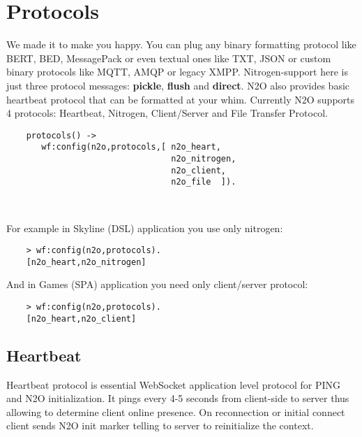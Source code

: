 
\section{Protocols}

We made it to make you happy.
You can plug any binary formatting protocol like BERT, BED, MessagePack
or even textual ones like TXT, JSON or custom binary protocols like MQTT, AMQP or legacy XMPP.
Nitrogen-support here is just three protocol messages: {\bf pickle}, {\bf flush} and {\bf direct}.
N2O also provides basic heartbeat protocol that can be formatted at your whim.
Currently N2O supports 4 protocols: Heartbeat, Nitrogen, Client/Server and File Transfer Protocol.

\vspace{1\baselineskip}
\begin{lstlisting}
    protocols() ->
       wf:config(n2o,protocols,[ n2o_heart,
                                 n2o_nitrogen,
                                 n2o_client,
                                 n2o_file  ]).

\end{lstlisting}
\vspace{1\baselineskip}

\

For example in Skyline (DSL) application you use only nitrogen:

\begin{lstlisting}
    > wf:config(n2o,protocols).
    [n2o_heart,n2o_nitrogen]
\end{lstlisting}

And in Games (SPA) application you need only client/server protocol:

\begin{lstlisting}
    > wf:config(n2o,protocols).
    [n2o_heart,n2o_client]
\end{lstlisting}

\subsection{Heartbeat}

Heartbeat protocol is essential WebSocket application level protocol for
PING and N2O initialization. It pings every 4-5 seconds from client-side to server
thus allowing to determine client online presence. On reconnection or initial connect
client sends N2O init marker telling to server to reinitialize the context.

